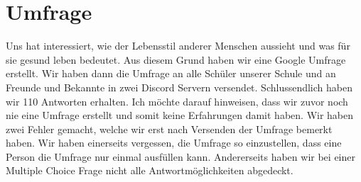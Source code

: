 \chapter{Umfrage}
\authortoc{\dario}{\chapterident}
Uns hat interessiert, wie der Lebensstil anderer Menschen aussieht und was für sie gesund leben bedeutet. Aus diesem Grund haben wir eine Google Umfrage erstellt. Wir haben dann die Umfrage an alle Schüler unserer Schule und an Freunde und Bekannte in zwei Discord Servern versendet. Schlussendlich haben wir 110 Antworten erhalten.
\newline
Ich möchte darauf hinweisen, dass wir zuvor noch nie eine Umfrage erstellt und somit keine Erfahrungen damit haben. Wir haben zwei Fehler gemacht, welche wir erst nach Versenden der Umfrage bemerkt haben. Wir haben einerseits vergessen, die Umfrage so einzustellen, dass eine Person die Umfrage nur einmal ausfüllen kann. Andererseits haben wir bei einer Multiple Choice Frage nicht alle Antwortmöglichkeiten abgedeckt.
